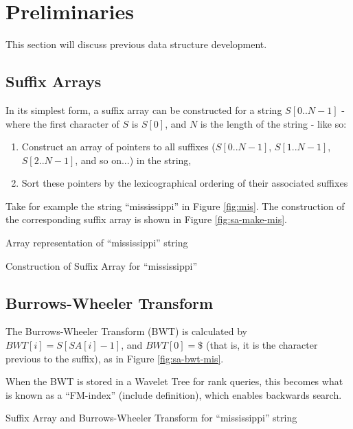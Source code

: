 \section{Preliminaries}
This section will discuss previous data structure development.

\subsection{Suffix Arrays}
In its simplest form, a suffix array can be constructed for a string
$S[0..N-1]$ - where the first character of $S$ is $S[0]$, and $N$ is the
length of the string - like so:

\begin{enumerate}
	\item
		Construct an array of pointers to all suffixes ($S[0..N-1]$, 
		$S[1..N-1]$, $S[2..N-1]$, and so on...) in the string,
	\item
		Sort these pointers by the lexicographical ordering of their associated
		suffixes
\end{enumerate}

Take for example the string ``mississippi'' in Figure \ref{fig:mis}.
The construction of the corresponding suffix array is shown in Figure
\ref{fig:sa-make-mis}.


			{Array representation of	``mississippi'' string}

			{Construction of Suffix Array for ``mississippi''}



\subsection{Burrows-Wheeler Transform}
The Burrows-Wheeler Transform (BWT) is calculated by $BWT[i] = S[SA[i]-1]$, and $BWT[0] = \$$ (that is, it is the character previous to the suffix), as in Figure \ref{fig:sa-bwt-mis}.

When the BWT is stored in a Wavelet Tree for rank queries, this becomes what is known as a ``FM-index'' (include definition), which enables backwards search.


			{Suffix Array and Burrows-Wheeler Transform for
			``mississippi'' string}


